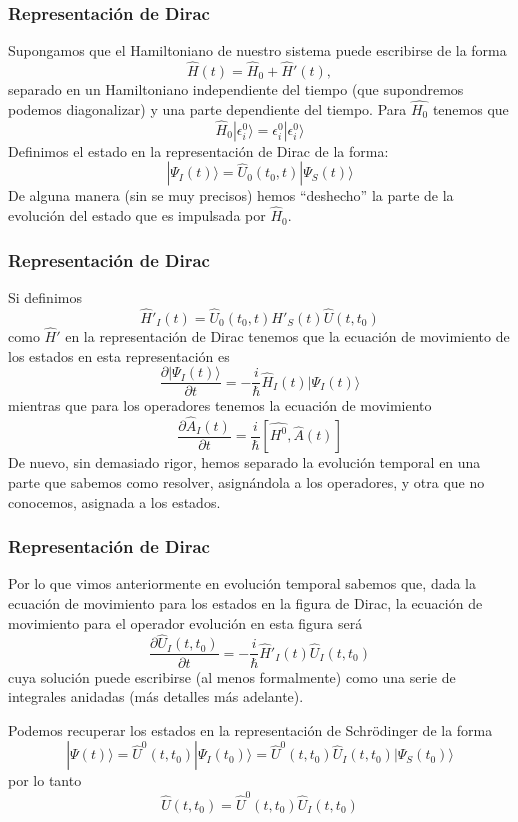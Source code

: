 \documentclass{beamer}
\begin{document}
\begin{frame}
    \frametitle{Representación de Dirac}
    Supongamos que el Hamiltoniano de nuestro sistema puede escribirse de la forma
    $$\hat{H}(t) = \hat{H}_0 + \hat{H}'(t),$$
    separado en un Hamiltoniano independiente del tiempo (que supondremos podemos diagonalizar) y una parte dependiente del tiempo. Para $\hat{H_0}$ tenemos que
    $$ \hat{H}_0 |\epsilon^0_i\rangle = \epsilon^0_i |\epsilon^0_i\rangle$$
    Definimos el estado en la representación de Dirac de la forma:
    $$|\Psi_I (t)\rangle = \hat{U}_0(t_0,t)|\Psi_S (t)\rangle$$
    De alguna manera (sin se muy precisos) hemos ``deshecho'' la parte de la evolución del estado que es impulsada por $\hat{H}_0$.
\end{frame}

\begin{frame}
    \frametitle{Representación de Dirac}
    Si definimos
    $$\hat{H}'_I (t) = \hat{U}_0(t_0,t)H'_S(t)\hat{U}(t,t_0)$$
    como $\hat{H}'$ en la representación de Dirac tenemos que la ecuación de movimiento de los estados en esta representación es
    $$\frac{\partial |\Psi_I (t)\rangle}{\partial t} = -\frac{i}{\hbar} \hat{H}_I (t) |\Psi_I (t)\rangle$$
    mientras que para los operadores tenemos la ecuación de movimiento
    $$\frac{\partial \hat{A}_I(t)}{\partial t} = \frac{i}{\hbar}[\hat{H^0},\hat{A}(t)]$$
    De nuevo, sin demasiado rigor, hemos separado la evolución temporal en una parte que sabemos como resolver, asignándola a los operadores, y otra que no conocemos, asignada a los estados.
\end{frame}

\begin{frame}
    \frametitle{Representación de Dirac}
    Por lo que vimos anteriormente en evolución temporal sabemos que, dada la ecuación de movimiento para los estados en la figura de Dirac, la ecuación de movimiento para el operador evolución en esta figura será
    $$\frac{\partial \hat{U}_I(t,t_0)}{\partial t} = -\frac{i}{\hbar} \hat{H}'_I(t)\hat{U}_I(t,t_0)$$
    cuya solución puede escribirse (al menos formalmente) como una serie de integrales anidadas (más detalles más adelante).

    Podemos recuperar los estados en la representación de Schrödinger de la forma
    $$ |\Psi(t)\rangle = \hat{U}^0(t,t_0)|\Psi_I(t_0)\rangle = \hat{U}^0(t,t_0)\hat{U}_I (t,t_0)|\Psi_S(t_0)\rangle$$
    por lo tanto
    $$ \hat{U}(t,t_0) = \hat{U}^0(t,t_0)\hat{U}_I (t,t_0) $$
\end{frame}
\end{document}

